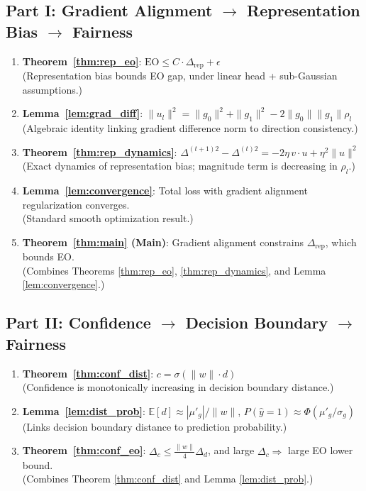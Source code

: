 \documentclass[11pt]{article}
\begin{document}
\subsection*{Part I: Gradient Alignment $\to$ Representation Bias $\to$ Fairness}

\begin{enumerate}
    \item \textbf{Theorem~\ref{thm:rep_eo}}: $\mathrm{EO} \leq C \cdot \Delta_{\mathrm{rep}} + \epsilon$ \\
    (Representation bias bounds EO gap, under linear head + sub-Gaussian assumptions.)

    \item \textbf{Lemma~\ref{lem:grad_diff}}: $\|u_l\|^2 = \|g_0\|^2 + \|g_1\|^2 - 2\|g_0\|\|g_1\|\rho_l$ \\
    (Algebraic identity linking gradient difference norm to direction consistency.)

    \item \textbf{Theorem~\ref{thm:rep_dynamics}}: $\Delta^{(t+1)2} - \Delta^{(t)2} = -2\eta\, v \cdot u + \eta^2\|u\|^2$ \\
    (Exact dynamics of representation bias; magnitude term is decreasing in $\rho_l$.)

    \item \textbf{Lemma~\ref{lem:convergence}}: Total loss with gradient alignment regularization converges. \\
    (Standard smooth optimization result.)

    \item \textbf{Theorem~\ref{thm:main} (Main)}: Gradient alignment constrains $\Delta_{\mathrm{rep}}$, which bounds EO. \\
    (Combines Theorems \ref{thm:rep_eo}, \ref{thm:rep_dynamics}, and Lemma \ref{lem:convergence}.)
\end{enumerate}

\subsection*{Part II: Confidence $\to$ Decision Boundary $\to$ Fairness}

\begin{enumerate}
    \item \textbf{Theorem~\ref{thm:conf_dist}}: $c = \sigma(\|w\| \cdot d)$ \\
    (Confidence is monotonically increasing in decision boundary distance.)

    \item \textbf{Lemma~\ref{lem:dist_prob}}: $\mathbb{E}[d] \approx |\mu'_g|/\|w\|$, $P(\hat{y}=1) \approx \Phi(\mu'_g/\sigma_g)$ \\
    (Links decision boundary distance to prediction probability.)

    \item \textbf{Theorem~\ref{thm:conf_eo}}: $\Delta_c \leq \frac{\|w\|}{4} \Delta_d$, and large $\Delta_c \Rightarrow$ large EO lower bound. \\
    (Combines Theorem \ref{thm:conf_dist} and Lemma \ref{lem:dist_prob}.)
\end{enumerate}
\end{document}
